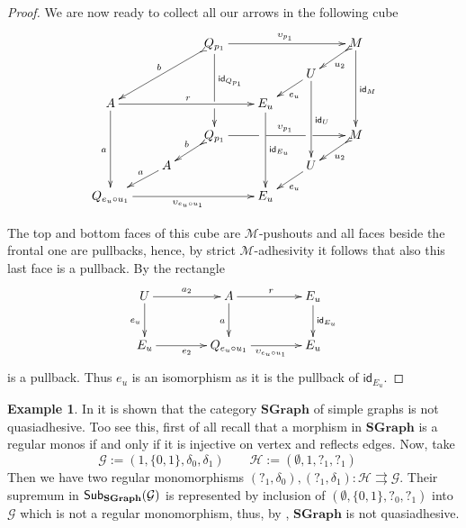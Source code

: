 \documentclass[a4paper]{article}
\newcommand{\msub}[2]{\mathsf{Sub}_{\textbf {\textup{#1}}}(#2)}
\newcommand{\cat}[1]{\ensuremath{\mathbf{#1}}}
\newcommand{\id}[1]{\mathsf{id}_{#1}}
\def\A{\textbf {\textup{A}}}
\theoremstyle{definition}
\newtheorem{example}[theorem]{Example}
\begin{document}
\begin{proof}
	We are now ready to collect all our arrows in the following cube
	\[\xymatrix@C=20pt@R=10pt{ & &Q_{p_1}\ar@{>->}[ddll]_{b} \ar[ddd]^(.4){\id{Q_{p_1}}}|(.666666)\hole\ar[rrr]^{\upsilon_{p_1}} &&&M \ar[ddd]^{\id{M}} \ar@{>->}[dl]^{u_2}\\&  &&&U \ar[ddd]^{\id{U}} \ar[dl]^{e_u} \\A \ar[ddd]_{a} \ar[rrr]^{r}&&& E_u\ar[ddd]^{\id{E_u}}\\&&Q_{p_1} \ar[rrr]|(.34)\hole^{\upsilon_{p_1}}|(.67)\hole \ar@{>->}[dl]_{b}&&& M \ar@{>->}[dl]^{u_2}\\ & A  \ar[dl]_(.4){a}&&& U \ar[dl]^{e_u} \\ Q_{e_u\circ u_1}\ar[rrr]_{\upsilon_{e_u\circ u_1}} &&& E_u}\]
	
	The top and bottom faces of this cube are $\mathcal{M}$-pushouts and all faces beside the frontal one are pullbacks, hence, by strict $\mathcal{M}$-adhesivity it follows that also this last face is a pullback. By  the rectangle
	\[\xymatrix@C=40pt{U\ar[r]^{a_2} \ar[d]_{e_u} & A \ar[r]^{r} \ar[d]_{a}& E_u \ar[d]^{\id{E_u}}\\
		E_u \ar[r]_{e_2}& Q_{e_u\circ u_1} \ar[r]_{\upsilon_{e_u\circ u_1}} & E_u}\]
	is a pullback. Thus $e_u$ is an isomorphism as it is the pullback of $\id{E_u}$.
\end{proof}

\begin{example}\label{ex:sem}In \cite{johnstone2007quasitoposes} it is shown that the category $\cat{SGraph}$ of simple graphs is not quasiadhesive. Too see this, first of all recall that a morphism in $\cat{SGraph}$ is a regular monos if and only if it is injective on vertex and reflects edges. Now, take 
	\[\mathcal{G}:=(1, \{0,1\}, \delta_0, \delta_1) \qquad \mathcal{H}:=( \emptyset, 1, ?_1, ?_1) \quad \]
	Then we have two regular monomorphisms $ (?_1, \delta_0), (?_1, \delta_1)\colon \mathcal{H}\rightrightarrows \mathcal{G} $. Their supremum in $\msub{SGraph}{\mathcal{G}}$ is represented by inclusion of $(\emptyset, \{0,1\}, ?_0, ?_1)$ into $\mathcal{G}$ which is not a regular monomorphism, thus, by , $\cat{SGraph}$ is not quasiadhesive. 
\end{example}
\end{document}
